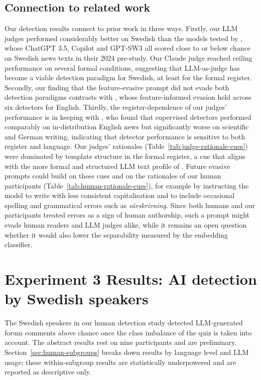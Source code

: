 \documentclass[thesis]{cluu}
\begin{document}
\subsection{Connection to related work}
Our detection results connect to prior work in three ways. Firstly, our LLM
judges performed considerably better on Swedish than the models tested by
\textcite{landberg2024aiwolf}, whose ChatGPT 3.5, Copilot and GPT-SW3 all
scored close to or below chance on Swedish news texts in their 2024 pre-study. Our Claude judge reached ceiling
performance on several formal conditions, suggesting that LLM-as-judge has
become a viable detection paradigm for Swedish, at
least for the formal register. Secondly, our finding that the feature-evasive
prompt did not evade both detection paradigms contrasts with
\textcite{lu2024sico}, whose feature-informed evasion held
across six detectors for English. Thirdly, the register-dependence
of our judges' performance is in keeping with \textcite{bao2024fastdetectgpt},
who found that supervised detectors performed comparably on in-distribution
English news but significantly worse on scientific and German writing,
indicating that detector performance is sensitive to both register and
language. Our judges' rationales (Table~\ref{tab:judge-rationale-cues}) were dominated by template structure in
the formal register, a cue that aligns with the more formal and structured LLM
text profile of \textcite{tang2023sciencedetectingllmgeneratedtexts}. Future evasive prompts could build on these cues and on the rationales of our human participants (Table~\ref{tab:human-rationale-cues}), for example by instructing the model to write with less consistent capitalisation and to include occasional spelling and grammatical errors such as \textit{särskrivning}. Since both humans \parencite{doruetal} and our participants treated errors as a sign of human authorship, such a prompt might evade human readers and LLM judges alike, while it remains an open question whether it would also lower the separability measured by the embedding classifier.

\section{Experiment 3 Results: AI detection by Swedish speakers}

The Swedish speakers in our human detection study detected LLM-generated forum comments above chance once the class imbalance of the quiz is taken into account. The abstract results rest on nine participants and are preliminary. Section~\ref{sec:human-subgroups} breaks down results by language level and LLM usage; these within-subgroup results are statistically underpowered and are reported as descriptive only.
\end{document}
